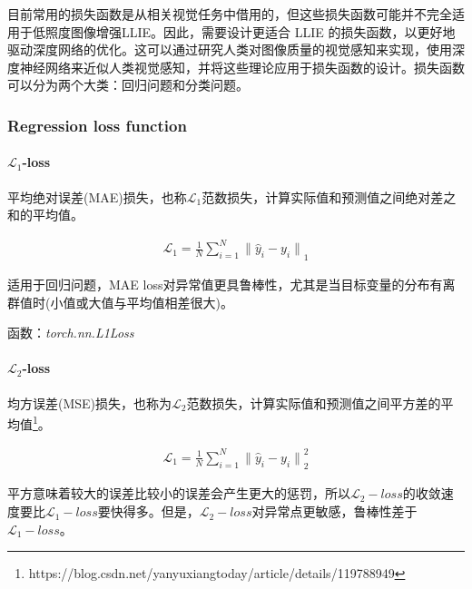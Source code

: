 \documentclass[letterpaper,12pt]{article}
\begin{document}
	目前常用的损失函数是从相关视觉任务中借用的，但这些损失函数可能并不完全适用于低照度图像增强LLIE。因此，需要设计更适合 LLIE 的损失函数，以更好地驱动深度网络的优化。这可以通过研究人类对图像质量的视觉感知来实现，使用深度神经网络来近似人类视觉感知，并将这些理论应用于损失函数的设计。损失函数可以分为两个大类：回归问题和分类问题。
	
	
	
		\subsubsection{Regression loss function}
		
			\paragraph{$\mathcal{L}_1$-loss}
		
			平均绝对误差(MAE)损失，也称$\mathcal{L}_1$范数损失，计算实际值和预测值之间绝对差之和的平均值。
			
			\begin{equation}
				\begin{aligned}
					\mathcal{L}_1 = \frac{1}{N} \sum_{i=1}^{N} {\| \hat{y}_i - y_i \|}_{1}
				\end{aligned}
			\end{equation}
		
			适用于回归问题，MAE loss对异常值更具鲁棒性，尤其是当目标变量的分布有离群值时(小值或大值与平均值相差很大)。
			
			函数：\textit{torch.nn.L1Loss}
			
			\paragraph{$\mathcal{L}_2$-loss}
			
			均方误差(MSE)损失，也称为$\mathcal{L}_2$范数损失，计算实际值和预测值之间平方差的平均值\footnote{https://blog.csdn.net/yanyuxiangtoday/article/details/119788949}。
			
			\begin{equation}
			\begin{aligned}
				\mathcal{L}_1 = \frac{1}{N} \sum_{i=1}^{N} {\| \hat{y}_i - y_i \|}_{2}^2
			\end{aligned}
			\end{equation}
			
			
			平方意味着较大的误差比较小的误差会产生更大的惩罚，所以$\mathcal{L}_2-loss$的收敛速度要比$\mathcal{L}_1-loss$要快得多。但是，$\mathcal{L}_2-loss$对异常点更敏感，鲁棒性差于$\mathcal{L}_1-loss$。
			
\end{document}
